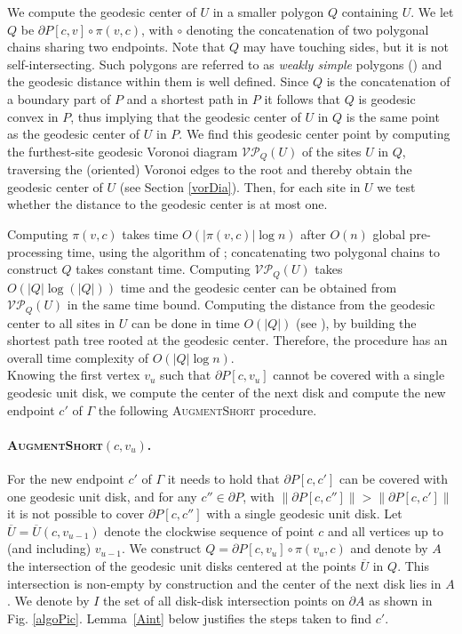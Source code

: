 \documentclass{llncs}
\begin{document}
 We compute the geodesic center of $U$ in a smaller polygon $Q$ containing $U$. We let $Q$ be $ \partial P[c, v]  \circ \pi(v,c)$, with $\circ$ denoting the concatenation of two polygonal chains sharing two endpoints. Note that $Q$ may have touching sides, but it is not self-intersecting. Such polygons are referred to as \emph{weakly simple} polygons (\cite{Dumitrescu2009112}) and the geodesic distance within them is well defined. Since $Q$ is the concatenation of a boundary part of $P$ and a shortest path in $P$ it follows that $Q$ is geodesic convex in $P$, thus implying that the geodesic center of $U$ in $Q$ is the same point as the geodesic center of $U$ in $P$. We find this geodesic center point by computing the furthest-site geodesic Voronoi diagram $\mathcal{VP}_Q(U)$ of the sites $U$ in $Q$, traversing the (oriented) Voronoi edges to the root and thereby obtain the geodesic center of $U$ (see Section \ref{vorDia}). Then, for each site in $U$ we test whether the distance to the geodesic center is at most one. 

  Computing $\pi(v,c)$ takes time $O(|\pi(v,c)|\log n)$ after $O(n)$ global pre-processing time, using the algorithm of \cite{Guibas1989126}; concatenating two polygonal chains to construct $Q$ takes constant time. Computing $\mathcal{VP}_Q(U)$ takes $O(|Q|\log(|Q|))$ time and the geodesic center can be obtained from $\mathcal{VP}_Q(U)$ in the same time bound. Computing the distance from the geodesic center to all sites in $U$ can be done in time $O(|Q|)$ (see \cite{lineshortpath}), by building the shortest path tree rooted at the geodesic center. 
Therefore, the procedure has an overall time complexity of $O(|Q|\log n)$. \\


Knowing the first vertex $v_u$ such that $\partial P[c,v_u]$ cannot be covered with a single geodesic unit disk, we compute the center of the next disk and compute the new endpoint $c'$ of $\Gamma$ the following \textsc{AugmentShort} procedure.

\paragraph{\textbf{\textsc{AugmentShort}$(c, v_u)$.}}
For the new endpoint $c'$ of $\Gamma$ it needs to hold that $\partial P[c, c']$ can be covered with one geodesic unit disk, and for any $c''  \in \partial P$, with $\|\partial P[c, c'']\| > \|\partial P[c, c']\|$ it is not possible to cover $\partial P[c, c'']$ with a single geodesic unit disk. 
Let $\overline{U} = \overline{U}(c,v_{u-1})$ denote the clockwise sequence of point $c$ and all vertices up to (and including) $v_{u-1}$. We construct $Q = \partial P[c, v_u]  \circ \pi(v_u,c)$ and denote by $A$ the intersection of the geodesic unit disks centered at the points $\overline{U}$ in $Q$. This intersection is non-empty by construction and the center of the next disk lies in $A$. We denote by $I$ the set of all disk-disk intersection points on $\partial A$ as shown in Fig. \ref{algoPic}. { Lemma~\ref{Aint} below justifies the steps taken to find $c'$}.
\end{document}
